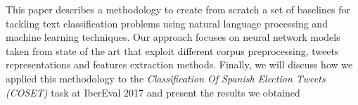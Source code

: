 \abstract

This paper describes a methodology to create from scratch a set of baselines for tackling text classification problems using natural language processing and machine learning techniques.
Our approach focuses on neural network models taken from state of the art that exploit different corpus preprocessing, tweets representations and features extraction methods.
Finally, we will discuss how we applied this methodology to the \emph{Classification Of Spanish Election Tweets (COSET)} task at IberEval 2017 and present the results we obtained